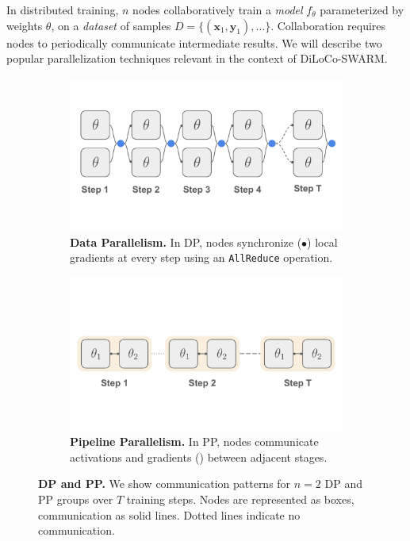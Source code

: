 \documentclass{article}
\newcommand{\orangebox}{\colorbox{oorange!50}{\hspace{0.3em}}}
\newcommand{\bluecircle}{\textcolor{bblue}{\LARGE$\bullet$}}
\begin{document}
In distributed training, $n$ nodes collaboratively train a \textit{model}
$f_{\theta}$ parameterized by weights $\theta$, on a \textit{dataset} of samples
$D = \{(\mathbf{x}_1, \mathbf{y}_1),\dots\}$. Collaboration requires nodes to
periodically communicate intermediate results. We will describe two popular
parallelization techniques relevant in the context of DiLoCo-SWARM.

\begin{figure}[ht]
    \centering
    \begin{subfigure}[b]{0.48\textwidth}
        \centering
        \vspace{0.5cm}
        \includegraphics[width=\textwidth]{figures/dp.pdf}
        \caption{\textbf{Data Parallelism.} In DP, nodes synchronize (\bluecircle) local gradients at every step using an \texttt{AllReduce}
        operation.}
        \label{fig:dp}
    \end{subfigure}
    \hfill
    \begin{subfigure}[b]{0.45\textwidth}
        \centering
        \vspace{0.5cm}
        \includegraphics[width=\textwidth]{figures/pp.pdf}
        \caption{\textbf{Pipeline Parallelism.} In PP, nodes communicate
        activations and gradients (\orangebox) between adjacent stages.}
        \label{fig:pp}
    \end{subfigure}
    \caption{\textbf{DP and PP.} We show communication patterns for $n=2$ DP and
    PP groups over $T$ training steps. Nodes are represented as boxes,
    communication as solid lines. Dotted lines indicate no communication.}
\end{figure}
\end{document}
